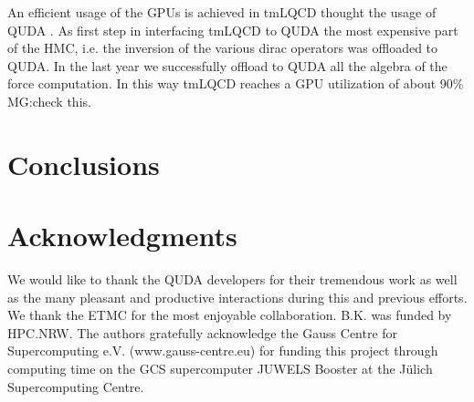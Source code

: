 \documentclass[a0,portrait]{a0poster}
\begin{document}
\begin{multicols}{2}
    An efficient usage of the GPUs is achieved in tmLQCD thought the usage of QUDA
    \cite{Clark:2009wm,Babich:2011np}. As first step in interfacing tmLQCD to QUDA \cite{Kostrzewa:2022hsv} the most expensive part of the HMC, i.e. the inversion of the various dirac operators was offloaded to QUDA.  In the last year we successfully offload to QUDA all the algebra of the force computation. In this way tmLQCD reaches a GPU utilization of about {90\% \color{red} MG:check this}. 


    \color{SaddleBrown} %

    \section*{Conclusions}
    \color{Black} %


    \section*{Acknowledgments}

    We would like to thank the QUDA developers for their tremendous work as well as the many pleasant and productive
    interactions during this and previous efforts. We thank the ETMC for the most enjoyable collaboration. B.K. was funded
    by HPC.NRW.
    The authors gratefully acknowledge the Gauss Centre for Supercomputing e.V.
    (www.gauss-centre.eu) for funding this project through computing time on the GCS supercomputer JUWELS Booster
    at the Jülich Supercomputing Centre.


\end{multicols}
\end{document}
